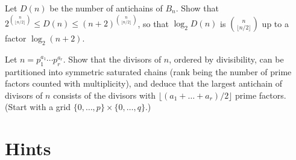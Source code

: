 \begin{exercise}[$\star\star$]\label{orders:ex:hansel}
Let $D(n)$ be the number of antichains of $B_n$. Show that $2^{\binom n{\lfloor n/2\rfloor}}\le D(n)\le(n+2)^{\binom n{\lfloor n/2\rfloor}}$, so that $\log_2D(n)$ is $\binom n{\lfloor n/2\rfloor}$ up to a factor
$\log_2(n+2)$.
\end{exercise}

\begin{exercise}[$\star\star\star$]\label{orders:ex:divisorscd}
Let $n=p_1^{a_1}\cdots p_r^{a_r}$. Show that the divisors of $n$, ordered by divisibility, can be partitioned into symmetric
saturated chains (rank being the number of prime factors counted with multiplicity), and deduce that the largest
antichain of divisors of $n$ consists of the divisors with $\lfloor(a_1+\dots+a_r)/2\rfloor$ prime factors. (Start with a grid
$\{0,\dots,p\}\times\{0,\dots,q\}$.)
\end{exercise}

\section{Hints}

